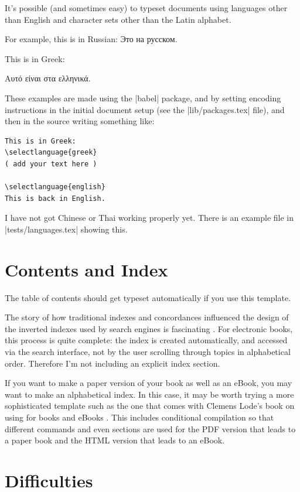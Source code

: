It's possible (and sometimes easy) to typeset documents using languages other than English
and character sets other than the Latin alphabet.

For example, this is in Russian:
Это на русском.

This is in Greek:

Αυτό είναι στα ελληνικά.

These examples are made using the \sverb|babel| package, and by setting
encoding instructions in the initial document setup (see the \sverb|lib/packages.tex| file),
and then in the \latex source writing something like:

\begin{Verbatim}[fontsize=\footnotesize]
This is in Greek:
\selectlanguage{greek}
( add your text here )

\selectlanguage{english}
This is back in English.
\end{Verbatim}

I have not got Chinese or Thai working properly yet. There is an example file in \sverb|tests/languages.tex|
showing this.

\section{Contents and Index}

The table of contents should get typeset automatically if you use this template.

The story of how traditional indexes and concordances influenced the design of the inverted
indexes used by search engines is fascinating \citep[Ch 1]{witten1999gigabytes}.
For electronic books, this process is quite complete: the index is created automatically,
and accessed via the search interface, not by the user scrolling through topics in alphabetical order.
Therefore I'm not including an explicit index section.

If you want to make a paper
version of your book as well as an eBook, you may want to make an alphabetical index.
In this case, it may be worth trying a
more sophisticated template such as the one that comes with Clemens
Lode's book on using \latex for books and eBooks \citep{lode2019better}.
This includes conditional compilation so that different commands and even sections are used
for the PDF version that leads to a paper book and the HTML version that leads to an eBook.

\section{Difficulties}

